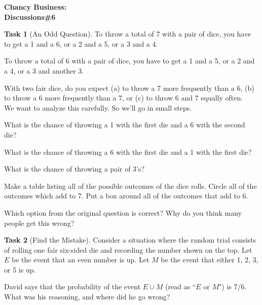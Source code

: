 \documentclass[12pt]{amsart}
\theoremstyle{definition}
\newtheorem{task}{Task}
\begin{document}
\begin{center}
\textbf{\Huge
Chancy Business:\\ Discussions\#6
}
\end{center}


\vspace{.5in}

 \begin{task}[An Odd Question]
 To throw a total of 7 with a pair of dice, you have to get a 1 and a 6, or a 2 and a 5, or a 3 and a 4.

To throw a total of 6 with a pair of dice, you have to get a 1 and a 5, or a 2 and a 4, or a 3 and another 3. 

With two fair dice, do you expect (a) to throw a 7 more frequently than a 6, (b) to throw a 6 more frequently than a 7, or (c) to throw 6 and 7 equally often.\\

We want to analyze this carefully. So we'll go in small steps.
\begin{compactitem}
\item What is the chance of throwing a 1 with the first die and a 6 with the second die?
\item What is the chance of throwing a 6 with the first die and a 1 with the first die?
\item What is the chance of throwing a pair of 3's?
\item Make a table listing all of the possible outcomes of the dice rolls. Circle all of the outcomes which add to 7. Put a box around all of the outcomes that add to 6. 
\item Which option from the original question is correct? Why do you think many people get this wrong?
\end{compactitem}
\end{task}

\begin{task}[Find the Mistake] Consider a situation where the random trial consists of rolling one fair six-sided die and recording the number shown on the top. Let $E$ be the event that an even number is up. Let $M$ be the event that either 1, 2, 3, or 5 is up.

David says that the probability of the event $E\cup M$ (read as ``$E$ or $M$") is 7/6. What was his reasoning, and where did he go wrong?
\end{task}
\end{document}
